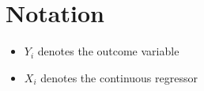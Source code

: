 \section{Notation}

\begin{itemize}
	\item $Y_i$ denotes the outcome variable
	\item $X_i$ denotes the continuous regressor
\end{itemize}
